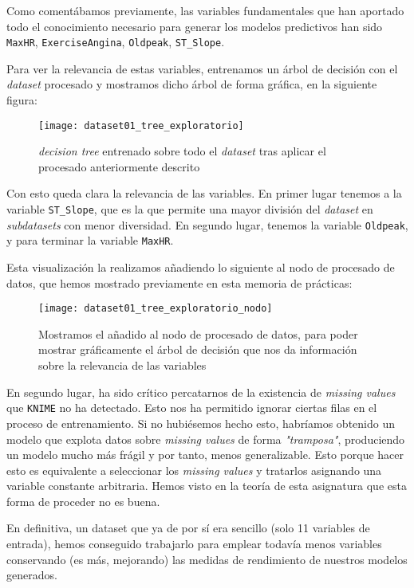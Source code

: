 \documentclass[11pt]{article}
\begin{document}
Como comentábamos previamente, las variables fundamentales que han aportado todo el conocimiento necesario para generar los modelos predictivos han sido \lstinline{MaxHR}, \lstinline{ExerciseAngina}, \lstinline{Oldpeak}, \lstinline{ST_Slope}.

Para ver la relevancia de estas variables, entrenamos un árbol de decisión con el \emph{dataset} procesado y mostramos dicho árbol de forma gráfica, en la siguiente figura:

\begin{figure}[h]
    \centering
    \texttt{[image: dataset01\_tree\_exploratorio]}
    \caption{\emph{decision tree} entrenado sobre todo el \emph{dataset} tras aplicar el procesado anteriormente descrito}
    \label{workflow_general:imagen}
\end{figure}

Con esto queda clara la relevancia de las variables. En primer lugar tenemos a la variable \lstinline{ST_Slope}, que es la que permite una mayor división del \emph{dataset} en \emph{subdatasets} con menor diversidad. En segundo lugar, tenemos la variable \lstinline{Oldpeak}, y para terminar la variable \lstinline{MaxHR}.

Esta visualización la realizamos añadiendo lo siguiente al nodo de procesado de datos, que hemos mostrado previamente en esta memoria de prácticas:

\begin{figure}[H]
    \centering
    \texttt{[image: dataset01\_tree\_exploratorio\_nodo]}
    \caption{Mostramos el añadido al nodo de procesado de datos, para poder mostrar gráficamente el árbol de decisión que nos da información sobre la relevancia de las variables}
\end{figure}

En segundo lugar, ha sido crítico percatarnos de la existencia de \emph{missing values} que \lstinline{KNIME} no ha detectado. Esto nos ha permitido ignorar ciertas filas en el proceso de entrenamiento. Si no hubiésemos hecho esto, habríamos obtenido un modelo que explota datos sobre \emph{missing values} de forma \emph{"tramposa"}, produciendo un modelo mucho más frágil y por tanto, menos generalizable. Esto porque hacer esto es equivalente a seleccionar los \emph{missing values} y tratarlos asignando una variable constante arbitraria. Hemos visto en la teoría de esta asignatura que esta forma de proceder no es buena.

En definitiva, un dataset que ya de por sí era sencillo (solo 11 variables de entrada), hemos conseguido trabajarlo para emplear todavía menos variables conservando (es más, mejorando) las medidas de rendimiento de nuestros modelos generados.
\end{document}
